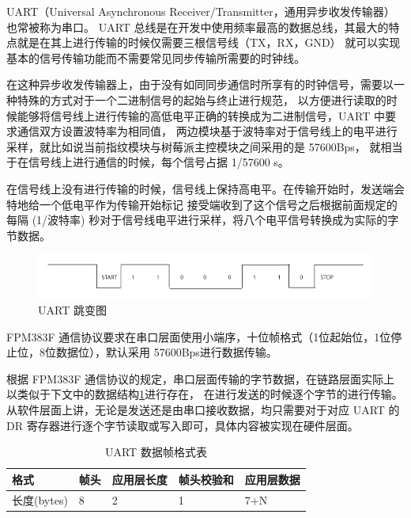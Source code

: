     UART（Universal Asynchronous Receiver/Transmitter，通用异步收发传输器）也常被称为串口。
    UART 总线是在开发中使用频率最高的数据总线，其最大的特点就是在其上进行传输的时候仅需要三根信号线（TX，RX，GND）
    就可以实现基本的信号传输功能而不需要常见同步传输所需要的时钟线。

    在这种异步收发传输器上，由于没有如同同步通信时所享有的时钟信号，需要以一种特殊的方式对于一个二进制信号的起始与终止进行规范，
    以方便进行读取的时候能够将信号线上进行传输的高低电平正确的转换成为二进制信号，UART 中要求通信双方设置波特率为相同值，
    两边模块基于波特率对于信号线上的电平进行采样，就比如说当前指纹模块与树莓派主控模块之间采用的是 57600Bps，
    就相当于在信号线上进行通信的时候，每个信号占据 1/57600 s。

    在信号线上没有进行传输的时候，信号线上保持高电平。在传输开始时，发送端会特地给一个低电平作为传输开始标记
    接受端收到了这个信号之后根据前面规定的每隔 (1/波特率) 秒对于信号线电平进行采样，将八个电平信号转换成为实际的字节数据。

    \begin{figure}[ht]
        \centering
        \includegraphics[scale=0.4]{imgs/UART跳变图.png}
        \caption{UART 跳变图}    \label{fig::uart}
    \end{figure}

    FPM383F 通信协议要求在串口层面使用小端序，十位帧格式（1位起始位，1位停止位，8位数据位），默认采用 57600Bps进行数据传输。
    \cite{noauthor_fpm383c_nodate}

    根据 FPM383F 通信协议的规定，串口层面传输的字节数据，在链路层面实际上以类似于下文中的数据结构\ref{FPM383F::UARTdataFrame}进行存在，
    在进行发送的时候逐个字节的进行传输。\cite{fpm383c-modular-communication-protocol}
    从软件层面上讲，无论是发送还是由串口接收数据，均只需要对于对应 UART 的 DR 寄存器进行逐个字节读取或写入即可，具体内容被实现在硬件层面。
    
    \begin{table}[ht]
        \centering
        \begin{tabular}{|l|l|l|l|l|}
        \hline
        格式        & 帧头 & 应用层长度 & 帧头校验和 & 应用层数据 \\ \hline
        长度(bytes) & 8  & 2     & 1     & 7+N   \\ \hline
        \end{tabular}
        \caption{UART 数据帧格式表} \label{FPM383F::UARTdataFrame}
    \end{table}
    
